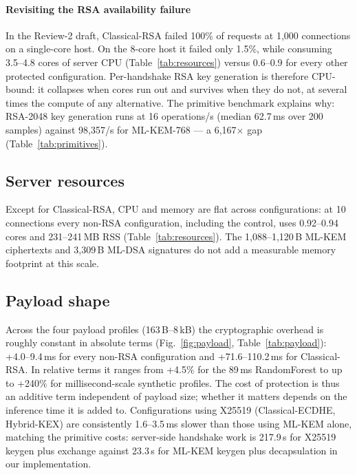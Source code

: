 \paragraph*{Revisiting the RSA availability failure} In the Review-2 draft, Classical-RSA failed
100\% of requests at 1,000 connections on a single-core host. On the 8-core host it failed only
1.5\%, while consuming 3.5--4.8 cores of server CPU (Table~\ref{tab:resources}) versus
0.6--0.9 for every other protected configuration. Per-handshake RSA key generation is therefore
CPU-bound: it collapses when cores run out and survives when they do not, at several times the
compute of any alternative. The primitive benchmark explains why: RSA-2048 key generation runs at
16 operations/s (median 62.7\,ms over 200 samples) against 98,357/s for ML-KEM-768 --- a
6,167$\times$ gap (Table~\ref{tab:primitives}).

\subsection{Server resources}\label{sec:res-resources}
Except for Classical-RSA, CPU and memory are flat across configurations: at 10 connections every
non-RSA configuration, including the control, uses 0.92--0.94 cores and 231--241\,MB RSS
(Table~\ref{tab:resources}). The 1,088--1,120\,B ML-KEM ciphertexts and 3,309\,B ML-DSA signatures
do not add a measurable memory footprint at this scale.

\subsection{Payload shape}\label{sec:res-payload}
Across the four payload profiles (163\,B--8\,kB) the cryptographic overhead is roughly constant in
absolute terms (Fig.~\ref{fig:payload}, Table~\ref{tab:payload}): +4.0--9.4\,ms for every
non-RSA configuration and +71.6--110.2\,ms for Classical-RSA. In relative terms it ranges from
+4.5\% for the 89\,ms RandomForest to up to +240\% for millisecond-scale synthetic profiles. The cost of
protection is thus an additive term independent of payload size; whether it matters depends on the
inference time it is added to. Configurations using X25519 (Classical-ECDHE, Hybrid-KEX) are
consistently 1.6--3.5\,ms slower than those using ML-KEM alone, matching the primitive costs:
server-side handshake work is 217.9\,\textmu s for X25519 keygen plus exchange against 23.3\,\textmu s
for ML-KEM keygen plus decapsulation in our implementation.

